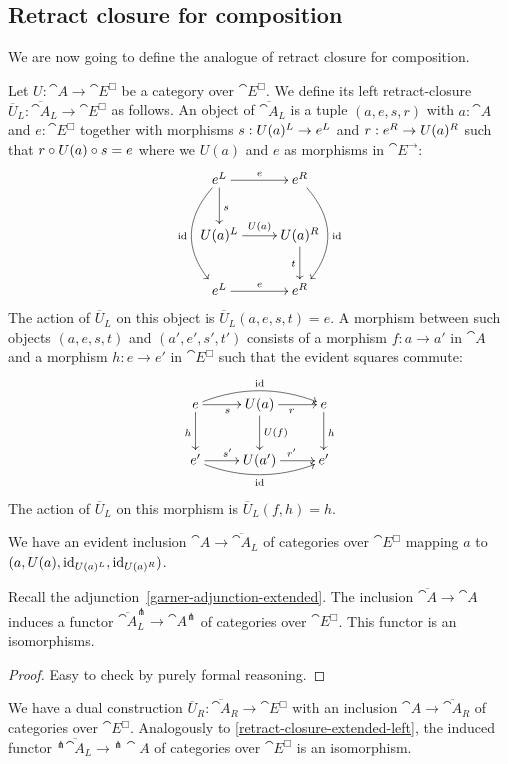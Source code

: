 \documentclass[reqno,10pt,a4paper,oneside]{amsart}
\begin{document}
\subsection{Retract closure for composition}

We are now going to define the analogue of retract closure for composition.

Let $U : \cat{A} \to \cat{E}^{\Box}$ be a category over $\cat{E}^{\Box}$.
We define its left retract-closure $\overline{U}_L : \overline{\cat{A}}_L \to \cat{E}^{\Box}$ as follows.
An object of $\overline{\cat{A}}_L$ is a tuple $(a, e, s, r)$ with $a : \cat{A}$ and $e : \cat{E}^{\Box}$ together with morphisms $s : U(a){}^L \to e{}^L$ and $r : e{}^R \to U(a){}^R$ such that $r \mathbin{\circ} U(a) \mathbin{\circ} s = e$ where we $U(a)$ and $e$ as morphisms in $\cat{E}^{\to}$:
\[
\xymatrix{
  e\sql
  \ar[r]^{e}
  \ar[d]^{s}
  \ar@/_2em/[dd]_{\id}
&
  e\sqr
  \ar@/^2em/[dd]^{\id}
\\
  U(a)\sql
  \ar[r]^{U(a)}
&
  U(a)\sqr
  \ar[d]_{t}
\\
  e\sql
  \ar[r]^{e}
&
  e\sqr
}
\]
The action of $\overline{U}_L$ on this object is $\overline{U}_L(a, e, s, t) = e$.
A morphism between such objects $(a, e, s, t)$ and $(a', e', s', t')$ consists of a morphism $f : a \to a'$ in $\cat{A}$ and a morphism $h : e \to e'$ in $\cat{E}^{\Box}$ such that the evident squares commute:
\[
\xymatrix{
  e
  \ar[r]_{s}
  \ar@/^1em/[rr]^{\id}
  \ar[d]_{h}
&
  U(a)
  \ar[r]_{r}
  \ar[d]^{U(f)}
&
  e
  \ar[d]^{h}
\\
  e'
  \ar[r]^{s'}
  \ar@/_1em/[rr]_{\id}
&
  U(a')
  \ar[r]^{r'}
&
  e'
}
\]
The action of $\overline{U}_L$ on this morphism is $\overline{U}_L(f, h) = h$.

We have an evident inclusion $\cat{A} \to \overline{\cat{A}}_L$ of categories over $\cat{E}^{\Box}$ mapping $a$ to $(a, U(a), \operatorname{id}_{U(a){}^L}, \operatorname{id}_{U(a){}^R})$.

\begin{lemma}
\label{retract-closure-extended-left}
Recall the adjunction~\eqref{garner-adjunction-extended}.
The inclusion $\overline{\cat{A}} \to \cat{A}$ induces a functor $\overline{\cat{A}}_L^{\pitchfork} \to \cat{A}^{\pitchfork}$ of categories over $\cat{E}^{\Box}$.
This functor is an isomorphisms.
\end{lemma}

\begin{proof}
Easy to check by purely formal reasoning.
\end{proof}

\begin{remark}
\label{retract-closure-extended-right}
We have a dual construction $\overline{U}_R : \overline{\cat{A}}_R \to \cat{E}^{\Box}$ with an inclusion $\cat{A} \to \overline{\cat{A}}_R$ of categories over $\cat{E}^{\Box}$.
Analogously to \cref{retract-closure-extended-left}, the induced functor $^{\pitchfork}\overline{\cat{A}}_L \to{} ^{\pitchfork}\cat{A}$ of categories over $\cat{E}^{\Box}$ is an isomorphism.
\end{remark}





\end{document}
